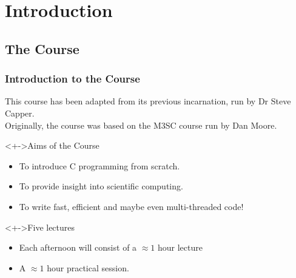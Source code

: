 \documentclass[smaller,handout,table]{beamer}
\subtitle{Lecture 1 of 5}
\begin{document}
{
\begin{frame}
  \titlepage
\end{frame}
}

\section{Introduction}
\subsection{The Course}

\begin{frame}
\frametitle{Introduction to the Course}
This course has been adapted from its previous incarnation, run by Dr Steve Capper.\\
Originally, the course was based on the M3SC course run by Dan Moore.
\begin{block}<+->{Aims of the Course}
\begin{itemize}
\item To introduce C programming from scratch.
\item To provide insight into scientific computing.
\item To write fast, efficient and maybe even multi-threaded code!
\end{itemize}
\end{block}

\begin{block}<+->{Five lectures}
\begin{itemize}
\item Each afternoon will consist of a $\approx 1$ hour lecture
\item A $\approx 1$ hour practical session.
\end{itemize}
\end{block}
\end{frame}
\end{document}
